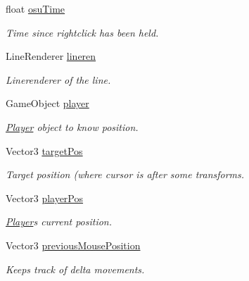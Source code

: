 \begin{DoxyCompactItemize}
\mbox{\label{class_shooting_aim_line_a7142bcf77a65c8f0149109c52f28dd94}} 
float \hyperlink{class_shooting_aim_line_a7142bcf77a65c8f0149109c52f28dd94}{osu\+Time}
\begin{DoxyCompactList}\small\item\em Time since rightclick has been held. \end{DoxyCompactList}\item 
\mbox{\label{class_shooting_aim_line_a8667da39555776758cd3d71f9a372c2b}} 
Line\+Renderer \hyperlink{class_shooting_aim_line_a8667da39555776758cd3d71f9a372c2b}{lineren}
\begin{DoxyCompactList}\small\item\em Linerenderer of the line. \end{DoxyCompactList}\item 
\mbox{\label{class_shooting_aim_line_acc23afdfb6681e1390bfe246cb4ac59e}} 
Game\+Object \hyperlink{class_shooting_aim_line_acc23afdfb6681e1390bfe246cb4ac59e}{player}
\begin{DoxyCompactList}\small\item\em \hyperlink{class_player}{Player} object to know position. \end{DoxyCompactList}\item 
\mbox{\label{class_shooting_aim_line_a1bb334d20675dc824fca0978f71a31c0}} 
Vector3 \hyperlink{class_shooting_aim_line_a1bb334d20675dc824fca0978f71a31c0}{target\+Pos}
\begin{DoxyCompactList}\small\item\em Target position (where cursor is after some transforms. \end{DoxyCompactList}\item 
\mbox{\label{class_shooting_aim_line_a155051b31c29841ea8052b3fe2ac2e07}} 
Vector3 \hyperlink{class_shooting_aim_line_a155051b31c29841ea8052b3fe2ac2e07}{player\+Pos}
\begin{DoxyCompactList}\small\item\em \hyperlink{class_player}{Player}\textquotesingle{}s current position. \end{DoxyCompactList}\item 
\mbox{\label{class_shooting_aim_line_abe45c1b304f04fac4e870a6f070bee66}} 
Vector3 \hyperlink{class_shooting_aim_line_abe45c1b304f04fac4e870a6f070bee66}{previous\+Mouse\+Position}
\begin{DoxyCompactList}\small\item\em Keeps track of delta movements. \end{DoxyCompactList}\end{DoxyCompactItemize}


